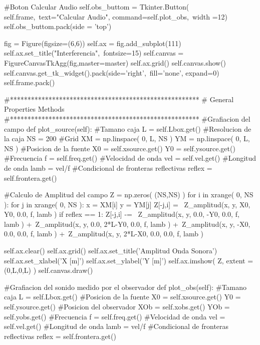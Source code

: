 \begin{listing}[style=python]
    #Boton Calcular Audio
    self.obs_buttom = Tkinter.Button( self.frame,\
    text="Calcular Audio", command=self.plot_obs,\
    width =12)
    self.obs_buttom.pack(side = 'top')

    fig = Figure(figsize=(6,6))
    self.ax = fig.add_subplot(111)
    self.ax.set_title("Interferencia",\
    fontsize=15)
    self.canvas = FigureCanvasTkAgg(fig,master=master)
    self.ax.grid()
    self.canvas.show()
    self.canvas.get_tk_widget().pack(side='right',\
    fill='none', expand=0)
    self.frame.pack()

  #******************************************************
  #	General Properties Methods
  #******************************************************
  #Grafiacion del campo
  def plot_source(self):
    #Tamano caja
    L = self.Lbox.get()
    #Resolucion de la caja
    NS = 200
    #Grid
    XM = np.linspace( 0, L, NS )
    YM = np.linspace( 0, L, NS )
    #Posicion de la fuente
    X0 = self.xsource.get()
    Y0 = self.ysource.get()
    #Frecuencia
    f = self.freq.get()
    #Velocidad de onda
    vel = self.vel.get()
    #Longitud de onda
    lamb = vel/f
    #Condicional de fronteras reflectivas
    reflex = self.frontera.get()
    
    #Calculo de Amplitud del campo
    Z = np.zeros( (NS,NS) )
    for i in xrange( 0, NS ):
      for j in xrange( 0, NS ):
	x = XM[i]
	y = YM[j]
	Z[-j,i] = \
	Z_amplitud(x, y, X0, Y0, 0.0, f, lamb )
	if reflex == 1:
	  Z[-j,i] -= \
	  Z_amplitud(x, y, 0.0, -Y0, 0.0, f, lamb ) +\
	  Z_amplitud(x, y, 0.0, 2*L-Y0, 0.0, f, lamb ) +\
	  Z_amplitud(x, y, -X0, 0.0, 0.0, f, lamb ) +\
	  Z_amplitud(x, y, 2*L-X0, 0.0, 0.0, f, lamb )

    self.ax.clear()
    self.ax.grid()
    self.ax.set_title('Amplitud Onda Sonora')
    self.ax.set_xlabel('X [m]')
    self.ax.set_ylabel('Y [m]')
    self.ax.imshow( Z, extent = (0,L,0,L) )
    self.canvas.draw()
    
    
  #Grafiacion del sonido medido por el observador
  def plot_obs(self):
    #Tamano caja
    L = self.Lbox.get()
    #Posicion de la fuente
    X0 = self.xsource.get()
    Y0 = self.ysource.get()
    #Posicion del observador
    XOb = self.xobs.get()
    YOb = self.yobs.get()
    #Frecuencia
    f = self.freq.get()
    #Velocidad de onda
    vel = self.vel.get()
    #Longitud de onda
    lamb = vel/f
    #Condicional de fronteras reflectivas
    reflex = self.frontera.get()
    

\end{listing}
